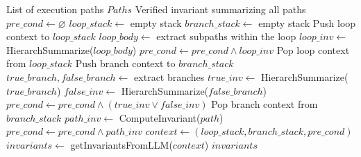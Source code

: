 

\begin{algorithm}[t]
\caption{Hierarchical Path Summarization with Verified Invariants}
\label{alg:hierarchical_abstraction}
\begin{algorithmic}[1]
\REQUIRE List of execution paths $Paths$
\ENSURE Verified invariant summarizing all paths
\STATE $pre\_cond \gets \varnothing$ 
\STATE $loop\_stack \gets$ empty stack
\STATE $branch\_stack \gets$ empty stack
        \STATE Push loop context to $loop\_stack$
        \STATE $loop\_body \gets$ extract subpaths within the loop
        \STATE $loop\_inv\gets$HierarchSummarize($loop\_body$)
        \STATE $pre\_cond \gets pre\_cond \wedge loop\_inv$
        \STATE Pop loop context from $loop\_stack$
        \STATE Push branch context to $branch\_stack$
        \STATE $true\_branch, false\_branch \gets$ extract branches
        \STATE $true\_inv \gets$ HierarchSummarize($true\_branch$)
        \STATE $false\_inv \gets$ HierarchSummarize($false\_branch$)
        \STATE $pre\_cond \gets pre\_cond \wedge (true\_inv \vee false\_inv)$
        \STATE Pop branch context from $branch\_stack$
    \ELSE
        \STATE $path\_inv \gets$ ComputeInvariant($path$)
        \STATE $pre\_cond \gets pre\_cond \wedge path\_inv$
    \ENDIF
\ENDFOR
\STATE $context \gets (loop\_stack, branch\_stack, pre\_cond)$
\STATE $invariants \gets$ getInvariantsFromLLM($context$)
\RETURN $invariants$
\end{algorithmic}
\end{algorithm}






